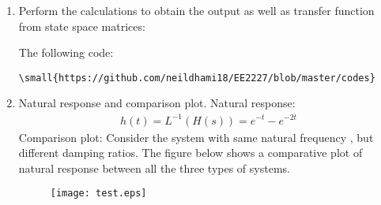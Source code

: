 \begin{enumerate}[label=\thesubsection.\arabic*.,ref=\thesubsection.\theenumi]
\item Perform the calculations to obtain the output as well as transfer function from state space matrices:

\solution The following code:

\begin{lstlisting}
\small{https://github.com/neildhami18/EE2227/blob/master/codes}
\end{lstlisting}

\item Natural response and comparison plot.
\newline
\solution Natural response:
\begin{align}
    h(t) = L^{-1}(H(s)) = e^{-t} - e^{-2t}
\end{align}
\solution Comparison plot:
\newline 
Consider the system with same natural frequency , but different damping ratios. The figure below shows a comparative plot of natural response between all the three types of systems.
\newline
\begin{figure}
\centering
\texttt{[image: test.eps]}
\end{figure}

\end{enumerate}
